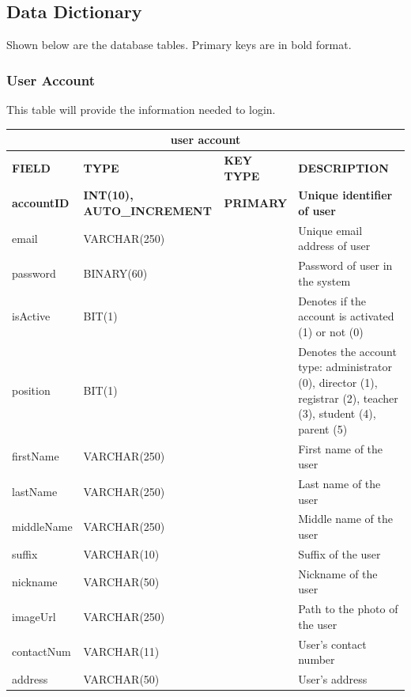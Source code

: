 \documentclass[11pt,a4paper,titlepage]{article}
\begin{document}
\newpage

\subsection{Data Dictionary}

Shown below are the database tables. Primary keys are in bold format.

\subsubsection{User Account}

This table will provide the information needed to login.

\vspace{1cm}
\begin{longtable}{ |p{2.5cm}|p{4.5cm}|p{2.5cm}|p{3cm}|  }
    \hline
    \multicolumn{4}{|c|}{\textbf{user account}} \\
    \hline
    \textbf{FIELD}&\textbf{TYPE}&\textbf{KEY TYPE}&\textbf{DESCRIPTION}\\
    \hline
    \textbf{accountID}   & \textbf{INT(10), AUTO\_INCREMENT}   & \textbf{PRIMARY} & \textbf{Unique identifier of user}\\ \hline
    email & VARCHAR(250) & & Unique email address of user\\ \hline
    password & BINARY(60) & & Password of user in the system \\ \hline
    isActive & BIT(1) & & Denotes if the account is activated (1) or not (0)\\ \hline
    position & BIT(1) & & Denotes the account type: administrator (0), director (1), registrar (2), teacher (3), student (4), parent (5)\\ \hline
    firstName & VARCHAR(250) & & First name of the user \\ \hline
    lastName & VARCHAR(250) & & Last name of the user \\ \hline
    middleName & VARCHAR(250) & & Middle name of the user \\ \hline
    suffix & VARCHAR(10) & & Suffix of the user \\ \hline
    nickname & VARCHAR(50) & & Nickname of the user \\ \hline
    imageUrl & VARCHAR(250) & & Path to the photo of the user \\ \hline
    contactNum & VARCHAR(11) & & User's contact number \\ \hline
    address & VARCHAR(50) & & User's address \\ \hline

\end{longtable}
\end{document}
